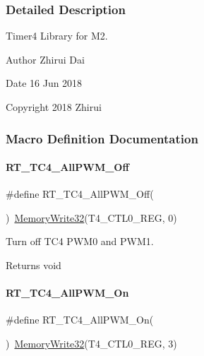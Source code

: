 \subsubsection{Detailed Description}
Timer4 Library for M2. 

\begin{DoxyAuthor}{Author}
Zhirui Dai 
\end{DoxyAuthor}
\begin{DoxyDate}{Date}
16 Jun 2018 
\end{DoxyDate}
\begin{DoxyCopyright}{Copyright}
2018 Zhirui 
\end{DoxyCopyright}


\subsubsection{Macro Definition Documentation}
\mbox{\label{a00050_a810820140a90f26db974ea72d81fac27}} 
\paragraph{\texorpdfstring{R\+T\+\_\+\+T\+C4\+\_\+\+All\+P\+W\+M\+\_\+\+Off}{RT\_TC4\_AllPWM\_Off}}
{\footnotesize\ttfamily \#define R\+T\+\_\+\+T\+C4\+\_\+\+All\+P\+W\+M\+\_\+\+Off(\begin{DoxyParamCaption}{ }\end{DoxyParamCaption})~\mbox{\hyperlink{a00020_a6b9732365b12e48ddb89fe1028b975b0}{Memory\+Write32}}(T4\+\_\+\+C\+T\+L0\+\_\+\+R\+EG, 0)}



Turn off T\+C4 P\+W\+M0 and P\+W\+M1. 

\begin{DoxyReturn}{Returns}
void 
\end{DoxyReturn}
\mbox{\label{a00050_af7e9317dddf60349a86619afdef1fba8}} 
\paragraph{\texorpdfstring{R\+T\+\_\+\+T\+C4\+\_\+\+All\+P\+W\+M\+\_\+\+On}{RT\_TC4\_AllPWM\_On}}
{\footnotesize\ttfamily \#define R\+T\+\_\+\+T\+C4\+\_\+\+All\+P\+W\+M\+\_\+\+On(\begin{DoxyParamCaption}{ }\end{DoxyParamCaption})~\mbox{\hyperlink{a00020_a6b9732365b12e48ddb89fe1028b975b0}{Memory\+Write32}}(T4\+\_\+\+C\+T\+L0\+\_\+\+R\+EG, 3)}



